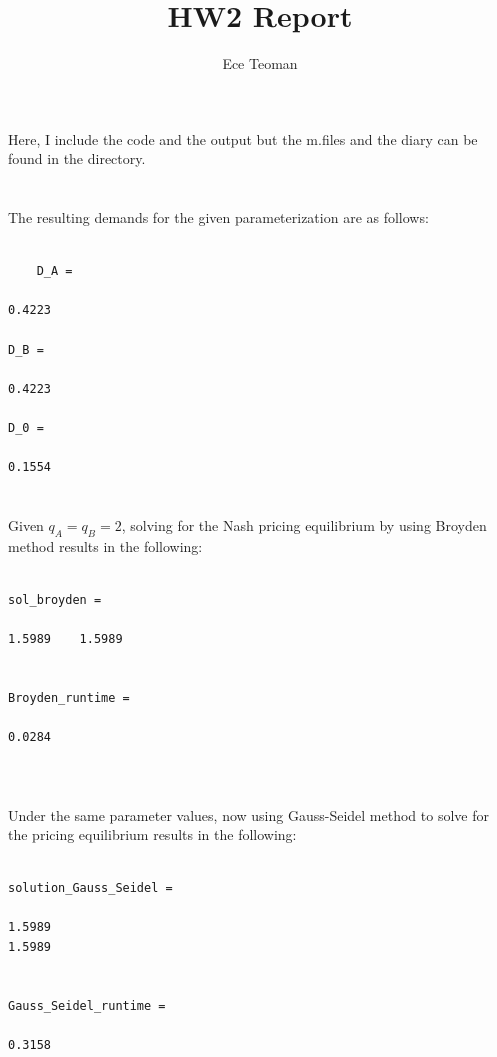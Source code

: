 \documentclass[12pt,oneside,reqno]{article}
\title{HW2 Report}
\author{Ece Teoman}
\theoremstyle{definition}
\theoremstyle{definition}
\theoremstyle{definition}
\theoremstyle{definition}
\theoremstyle{definition}
\theoremstyle{definition}
\theoremstyle{definition}
\theoremstyle{definition}
\theoremstyle{definition}
\begin{document}
	
	\maketitle
	\section*{}
	
	Here, I include the code and the output but the m.files and the diary can be found in the directory.
	
	\section{}

The resulting demands for the given parameterization are as follows:
\begin{lstlisting}

	D_A =

0.4223

D_B =

0.4223

D_0 =

0.1554

\end{lstlisting}


	\section{}

Given $q_A = q_B = 2$, solving for the Nash pricing equilibrium by using Broyden method results in the following:

\begin{lstlisting}

sol_broyden =

1.5989    1.5989


Broyden_runtime =

0.0284


\end{lstlisting}

	\section{}

Under the same parameter values, now using Gauss-Seidel method to solve for the pricing equilibrium results in the following:

\begin{lstlisting}

solution_Gauss_Seidel =

1.5989
1.5989


Gauss_Seidel_runtime =

0.3158


\end{lstlisting}
\end{document}

